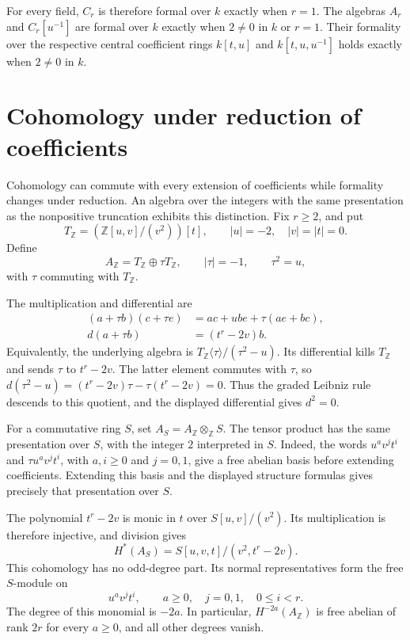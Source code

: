 For every field, $C_r$ is therefore formal over $k$ exactly when
$r=1$.
The algebras $A_r$ and $C_r[u^{-1}]$ are formal over $k$ exactly
when $2\ne0$ in $k$ or $r=1$.
Their formality over the respective central coefficient rings
$k[t,u]$ and $k[t,u,u^{-1}]$ holds exactly when $2\ne0$ in $k$.

\section{Cohomology under reduction of coefficients}
\label{sec:ha-integral-reduction}

Cohomology can commute with every extension of coefficients while
formality changes under reduction.
An algebra over the integers with the same presentation as the
nonpositive truncation exhibits this distinction.
Fix $r\geq2$, and put
\[
 T_{\mathbb Z}=(\mathbb Z[u,v]/(v^2))[t],
 \qquad |u|=-2,\quad |v|=|t|=0.
\]
Define
\[
 A_{\mathbb Z}=T_{\mathbb Z}\oplus\tau T_{\mathbb Z},
 \qquad |\tau|=-1,\qquad \tau^2=u,
\]
with $\tau$ commuting with $T_{\mathbb Z}$.

The multiplication and differential are
\[
 \begin{split}
 (a+\tau b)(c+\tau e)&=ac+ube+\tau(ae+bc),\\
 d(a+\tau b)&=(t^r-2v)b.
 \end{split}
\]
Equivalently, the underlying algebra is
$T_{\mathbb Z}\langle\tau\rangle/(\tau^2-u)$.
Its differential kills $T_{\mathbb Z}$ and sends $\tau$ to $t^r-2v$.
The latter element commutes with $\tau$, so
$d(\tau^2-u)=(t^r-2v)\tau-\tau(t^r-2v)=0$.
Thus the graded Leibniz rule descends to this quotient, and the
displayed differential gives $d^2=0$.

For a commutative ring $S$, set
$A_S=A_{\mathbb Z}\otimes_{\mathbb Z}S$.
The tensor product has the same presentation over $S$, with the
integer $2$ interpreted in $S$.
Indeed, the words $u^av^jt^i$ and $\tau u^av^jt^i$, with
$a,i\geq0$ and $j=0,1$, give a free abelian basis before extending
coefficients. Extending this basis and the displayed structure
formulas gives precisely that presentation over $S$.

The polynomial $t^r-2v$ is monic in $t$ over $S[u,v]/(v^2)$.
Its multiplication is therefore injective, and division gives
\[
 H^*(A_S)=S[u,v,t]/(v^2,t^r-2v).
\]
This cohomology has no odd-degree part.
Its normal representatives form the free $S$-module on
\[
 u^av^jt^i,\qquad a\geq0,\quad j=0,1,\quad 0\leq i<r.
\]
The degree of this monomial is $-2a$.
In particular, $H^{-2a}(A_{\mathbb Z})$ is free abelian of rank
$2r$ for every $a\geq0$, and all other degrees vanish.


